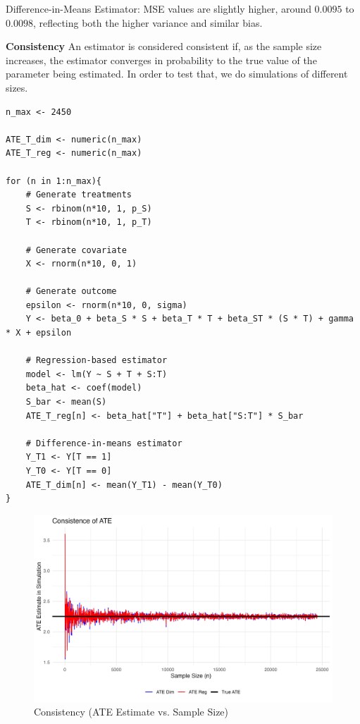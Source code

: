 \documentclass{article}
\begin{document}
Difference-in-Means Estimator: MSE values are slightly higher, around \(0.0095\) to \(0.0098\), reflecting both the higher variance and similar bias.

\textbf{Consistency}
An estimator is considered consistent if, as the sample size increases, the estimator converges in probability to the true value of the parameter being estimated. In order to test that, we do simulations of different sizes.

\begin{lstlisting}[style=Rstyle, caption=Consistency Monte Carlo Simulation in R]
n_max <- 2450

ATE_T_dim <- numeric(n_max)
ATE_T_reg <- numeric(n_max)

for (n in 1:n_max){
    # Generate treatments
    S <- rbinom(n*10, 1, p_S)
    T <- rbinom(n*10, 1, p_T)
    
    # Generate covariate
    X <- rnorm(n*10, 0, 1)
    
    # Generate outcome
    epsilon <- rnorm(n*10, 0, sigma)
    Y <- beta_0 + beta_S * S + beta_T * T + beta_ST * (S * T) + gamma * X + epsilon
    
    # Regression-based estimator
    model <- lm(Y ~ S + T + S:T)
    beta_hat <- coef(model)
    S_bar <- mean(S)
    ATE_T_reg[n] <- beta_hat["T"] + beta_hat["S:T"] * S_bar
    
    # Difference-in-means estimator
    Y_T1 <- Y[T == 1]
    Y_T0 <- Y[T == 0]
    ATE_T_dim[n] <- mean(Y_T1) - mean(Y_T0)
}
\end{lstlisting}

\begin{figure}[H]
  \centering
  \includegraphics[width=\textwidth]{monte_carlo_ate_consistence.png}
  \caption{Consistency (ATE Estimate vs. Sample Size)}
  \label{fig:your_image_label}
\end{figure}
\end{document}
